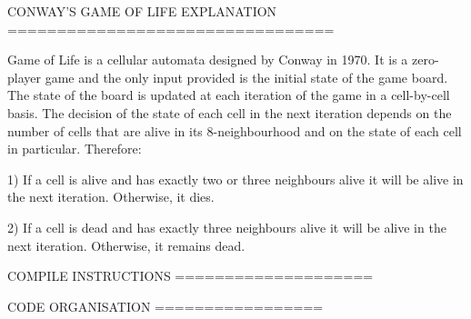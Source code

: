 CONWAY'S GAME OF LIFE EXPLANATION
=================================

Game of Life is a cellular automata designed by Conway in 1970. It is a zero-player game and the only input provided is the initial state of the game board.
The state of the board is updated at each iteration of the game in a cell-by-cell basis. The decision of the state of each cell in the next iteration depends
on the number of cells that are alive in its 8-neighbourhood and on the state of each cell in particular. Therefore:

	1) If a cell is alive and has exactly two or three neighbours alive it will be alive in the next iteration. Otherwise, it dies.

	2) If a cell is dead and has exactly three neighbours alive it will be alive in the next iteration. Otherwise, it remains dead.

COMPILE INSTRUCTIONS
====================

CODE ORGANISATION
=================

